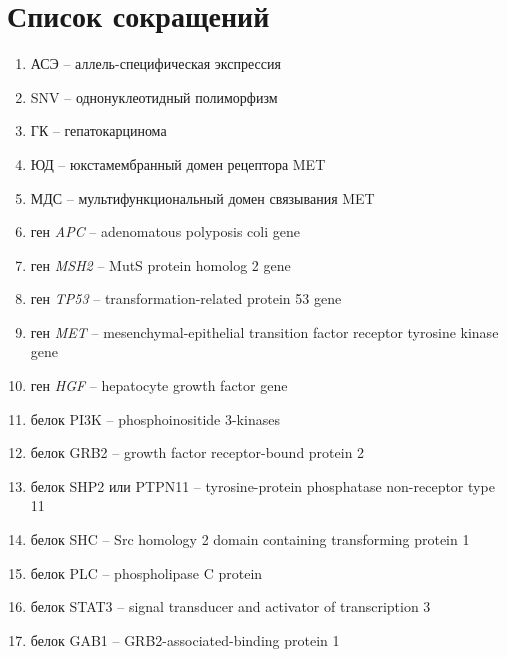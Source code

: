 \section{Список сокращений}

\begin{enumerate}
	\item АСЭ -- аллель-специфическая экспрессия
	\item SNV -- однонуклеотидный полиморфизм
	\item ГК -- гепатокарцинома
	\item ЮД -- юкстамембранный домен рецептора MET
	\item МДС -- мультифункциональный домен связывания MET
	\item ген \textit{APC} -- adenomatous polyposis coli gene
	\item ген \textit{MSH2} -- MutS protein homolog 2 gene  
	\item ген \textit{TP53} -- transformation-related protein 53 gene
	\item ген \textit{MET} -- mesenchymal-epithelial transition factor receptor tyrosine kinase gene 
	\item ген \textit{HGF} -- hepatocyte growth factor gene
	\item белок PI3K -- phosphoinositide 3-kinases
	\item белок GRB2 -- growth factor receptor-bound protein 2
	\item белок SHP2 или PTPN11 -- tyrosine-protein phosphatase non-receptor type 11
	\item белок SHC -- Src homology 2 domain containing transforming protein 1
	\item белок PLC -- phospholipase C protein
	\item белок STAT3 -- signal transducer and activator of transcription 3
	\item белок GAB1 -- GRB2-associated-binding protein 1
\end{enumerate}